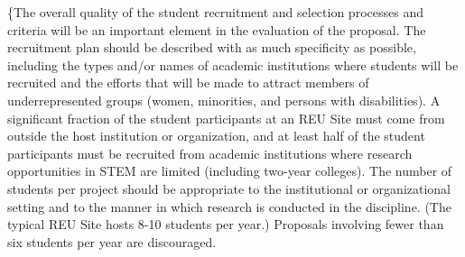 
\{The overall quality of the student recruitment and selection processes and criteria will be an important element in the evaluation of the proposal. The recruitment plan should be described with as much specificity as possible, including the types and/or names of academic institutions where students will be recruited and the efforts that will be made to attract members of underrepresented groups (women, minorities, and persons with disabilities).
A significant fraction of the student participants at an REU Site must come from outside the host institution or organization, and at least half of the student participants must be recruited from academic institutions where research opportunities in STEM are limited (including two-year colleges). The number of students per project should be appropriate to the institutional or organizational setting and to the manner in which research is conducted in the discipline. (The typical REU Site hosts 8-10 students per year.) Proposals involving fewer than six students per year are discouraged.

